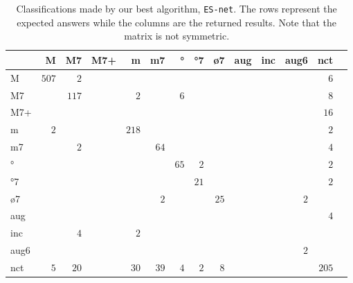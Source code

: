 \documentclass{article}
\begin{document}
\begin{table*}
\centering
\begin{tabular}{l||r|r|r|r|r|r|r|r|r|r|r|r|r|}
      &     M &    M7 &   M7+ &     m &    m7 &    ° &   °7 &   ø7 &   aug &   inc &  aug6 &   nct \\  \hline \hline
    M & $ 507 $ & $   2 $ & $     $ & $     $ & $     $ & $     $ & $     $ & $     $ & $     $ & $     $ & $     $ & $   6 $ \\ \hline
   M7 & $     $ & $ 117 $ & $     $ & $   2 $ & $     $ & $   6 $ & $     $ & $     $ & $     $ & $     $ & $     $ & $   8 $ \\ \hline
  M7+ & $     $ & $     $ & $     $ & $     $ & $     $ & $     $ & $     $ & $     $ & $     $ & $     $ & $     $ & $  16 $ \\ \hline
    m & $   2 $ & $     $ & $     $ & $ 218 $ & $     $ & $     $ & $     $ & $     $ & $     $ & $     $ & $     $ & $   2 $ \\ \hline
   m7 & $     $ & $   2 $ & $     $ & $     $ & $  64 $ & $     $ & $     $ & $     $ & $     $ & $     $ & $     $ & $   4 $ \\ \hline
   ° & $     $ & $     $ & $     $ & $     $ & $     $ & $  65 $ & $   2 $ & $     $ & $     $ & $     $ & $     $ & $   2 $ \\ \hline
  °7 & $     $ & $     $ & $     $ & $     $ & $     $ & $     $ & $  21 $ & $     $ & $     $ & $     $ & $     $ & $   2 $ \\ \hline
  ø7 & $     $ & $     $ & $     $ & $     $ & $   2 $ & $     $ & $     $ & $  25 $ & $     $ & $     $ & $   2 $ & $     $ \\ \hline
  aug & $     $ & $     $ & $     $ & $     $ & $     $ & $     $ & $     $ & $     $ & $     $ & $     $ & $     $ & $   4 $ \\ \hline
  inc & $     $ & $   4 $ & $     $ & $   2 $ & $     $ & $     $ & $     $ & $     $ & $     $ & $     $ & $     $ & $     $ \\ \hline
 aug6 & $     $ & $     $ & $     $ & $     $ & $     $ & $     $ & $     $ & $     $ & $     $ & $     $ & $   2 $ & $     $ \\ \hline
  nct & $   5 $ & $  20 $ & $     $ & $  30 $ & $  39 $ & $   4 $ & $   2 $ & $   8 $ & $     $ & $     $ & $     $ & $ 205 $ \\ \hline
\end{tabular}

\caption{Classifications made by our best algorithm, \texttt{ES-net}. The rows represent
  the expected answers while the columns are the returned
  results. Note that the matrix is not symmetric.}
\label{tab:erros-es-net}
\end{table*}
\end{document}
